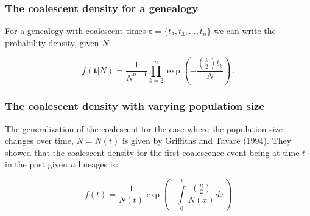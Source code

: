 \begin{frame}
\frametitle{The coalescent density for a genealogy}

For a genealogy with coalescent times $\mathbf{t}=\{t_2, t_3, ..., t_n\}$ we can write the probability density, given $N$:

\begin{equation*}
f(\mathbf{t}|N)=\frac{1}{N^{n-1}}\prod_{k=2}^n\exp\left(-\frac{{k \choose 2}t_k}{N}\right)\,.
\end{equation*}


\end{frame}

\begin{frame}
\frametitle{The coalescent density with varying population size}

The generalization of the coalescent for the case where the
population size changes over time, $N = N(t)$ is given by Griffiths and Tavare (1994). They showed that the coalescent density for the first coalescence event being at time $t$ in the past given $n$ lineages is:

\begin{equation*}
f(t) = {\frac{1}{N(t)}}  
{\exp\left(-{\int \limits_0^t \frac{\binom{n}{2}}{N(x)} dx }\right)} 
\label{coalescent-density-with-nt}
\end{equation*}

\end{frame}

